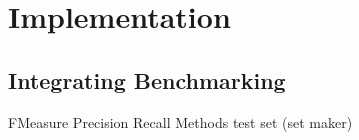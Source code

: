 %
\section{Implementation}
\label{sec_implementation}




\subsection{Integrating Benchmarking}
FMeasure
Precision
Recall
Methods
test set (set maker)